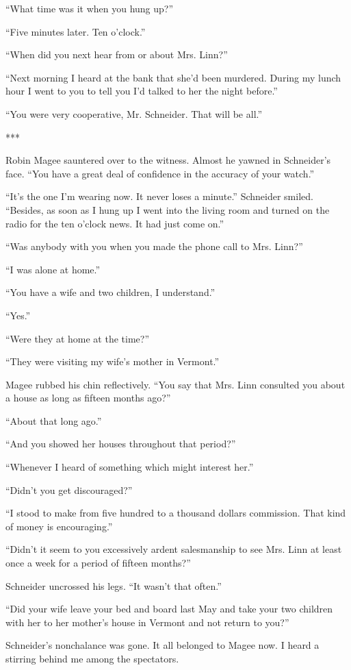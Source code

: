 {“What time was it when you hung up?”

“Five minutes later. Ten o’clock.”

“When did you next hear from or about Mrs. Linn?”

“Next morning I heard at the bank that she’d been murdered. During my lunch hour I went to you to tell you I’d talked to her the night before.”

“You were very cooperative, Mr. Schneider. That will be all.”

***

Robin Magee sauntered over to the witness. Almost he yawned in Schneider’s face. “You have a great deal of confidence in the accuracy of your watch.”

“It’s the one I’m wearing now. It never loses a minute.” Schneider smiled. “Besides, as soon as I hung up I went into the living room and turned on the radio for the ten o’clock news. It had just come on.”

“Was anybody with you when you made the phone call to Mrs. Linn?”

“I was alone at home.”

“You have a wife and two children, I understand.”

“Yes.”

“Were they at home at the time?”

“They were visiting my wife’s mother in Vermont.”

Magee rubbed his chin reflectively. “You say that Mrs. Linn consulted you about a house as long as fifteen months ago?”

“About that long ago.”

“And you showed her houses throughout that period?”

“Whenever I heard of something which might interest her.”

“Didn’t you get discouraged?”

“I stood to make from five hundred to a thousand dollars commission. That kind of money is encouraging.”

“Didn’t it seem to you excessively ardent salesmanship to see Mrs. Linn at least once a week for a period of fifteen months?”

Schneider uncrossed his legs. “It wasn’t that often.”

“Did your wife leave your bed and board last May and take your two children with her to her mother’s house in Vermont and not return to you?”

Schneider’s nonchalance was gone. It all belonged to Magee now. I heard a stirring behind me among the spectators.

}
